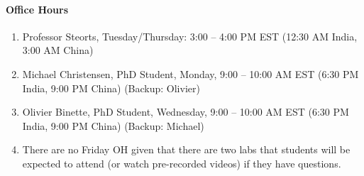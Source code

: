 \documentclass[11pt]{article}
\begin{document}
\paragraph{Office Hours}
\begin{enumerate}
\item Professor Steorts, Tuesday/Thursday: 3:00 -- 4:00 PM EST (12:30 AM India, 3:00 AM China)
\item Michael Christensen, PhD Student, Monday, 9:00 -- 10:00 AM EST (6:30 PM India, 9:00 PM China) (Backup: Olivier)
\item Olivier Binette, PhD Student, Wednesday, 9:00 -- 10:00 AM EST (6:30 PM India, 9:00 PM China) (Backup: Michael)
\item There are no Friday OH given that there are two labs that students will be expected to attend (or watch pre-recorded videos) if they have questions. 
\end{enumerate}





%
%
%

\end{document}
